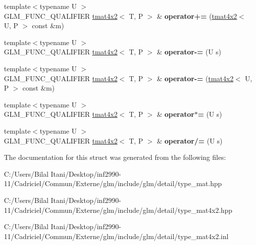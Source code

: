 \begin{DoxyCompactItemize}
\item 
{\footnotesize template$<$typename U $>$ }\\G\+L\+M\+\_\+\+F\+U\+N\+C\+\_\+\+Q\+U\+A\+L\+I\+F\+I\+ER \hyperlink{structglm_1_1detail_1_1tmat4x2}{tmat4x2}$<$ T, P $>$ \& {\bfseries operator+=} (\hyperlink{structglm_1_1detail_1_1tmat4x2}{tmat4x2}$<$ U, P $>$ const \&m)\hypertarget{structglm_1_1detail_1_1tmat4x2_a39682439b0540114d8a90dfb96ff09e7}{}\label{structglm_1_1detail_1_1tmat4x2_a39682439b0540114d8a90dfb96ff09e7}

\item 
{\footnotesize template$<$typename U $>$ }\\G\+L\+M\+\_\+\+F\+U\+N\+C\+\_\+\+Q\+U\+A\+L\+I\+F\+I\+ER \hyperlink{structglm_1_1detail_1_1tmat4x2}{tmat4x2}$<$ T, P $>$ \& {\bfseries operator-\/=} (U s)\hypertarget{structglm_1_1detail_1_1tmat4x2_a1e70f82c8238bde1d32bb4398464079c}{}\label{structglm_1_1detail_1_1tmat4x2_a1e70f82c8238bde1d32bb4398464079c}

\item 
{\footnotesize template$<$typename U $>$ }\\G\+L\+M\+\_\+\+F\+U\+N\+C\+\_\+\+Q\+U\+A\+L\+I\+F\+I\+ER \hyperlink{structglm_1_1detail_1_1tmat4x2}{tmat4x2}$<$ T, P $>$ \& {\bfseries operator-\/=} (\hyperlink{structglm_1_1detail_1_1tmat4x2}{tmat4x2}$<$ U, P $>$ const \&m)\hypertarget{structglm_1_1detail_1_1tmat4x2_a85080df35d7d859072e4bdcd955747d5}{}\label{structglm_1_1detail_1_1tmat4x2_a85080df35d7d859072e4bdcd955747d5}

\item 
{\footnotesize template$<$typename U $>$ }\\G\+L\+M\+\_\+\+F\+U\+N\+C\+\_\+\+Q\+U\+A\+L\+I\+F\+I\+ER \hyperlink{structglm_1_1detail_1_1tmat4x2}{tmat4x2}$<$ T, P $>$ \& {\bfseries operator$\ast$=} (U s)\hypertarget{structglm_1_1detail_1_1tmat4x2_a2fc51001f24270fc2c93b824668678ad}{}\label{structglm_1_1detail_1_1tmat4x2_a2fc51001f24270fc2c93b824668678ad}

\item 
{\footnotesize template$<$typename U $>$ }\\G\+L\+M\+\_\+\+F\+U\+N\+C\+\_\+\+Q\+U\+A\+L\+I\+F\+I\+ER \hyperlink{structglm_1_1detail_1_1tmat4x2}{tmat4x2}$<$ T, P $>$ \& {\bfseries operator/=} (U s)\hypertarget{structglm_1_1detail_1_1tmat4x2_acfd79479bd1ebfb4a6c7c654d0648a5b}{}\label{structglm_1_1detail_1_1tmat4x2_acfd79479bd1ebfb4a6c7c654d0648a5b}

\end{DoxyCompactItemize}


The documentation for this struct was generated from the following files\+:\begin{DoxyCompactItemize}
\item 
C\+:/\+Users/\+Bilal Itani/\+Desktop/inf2990-\/11/\+Cadriciel/\+Commun/\+Externe/glm/include/glm/detail/type\+\_\+mat.\+hpp\item 
C\+:/\+Users/\+Bilal Itani/\+Desktop/inf2990-\/11/\+Cadriciel/\+Commun/\+Externe/glm/include/glm/detail/type\+\_\+mat4x2.\+hpp\item 
C\+:/\+Users/\+Bilal Itani/\+Desktop/inf2990-\/11/\+Cadriciel/\+Commun/\+Externe/glm/include/glm/detail/type\+\_\+mat4x2.\+inl\end{DoxyCompactItemize}
